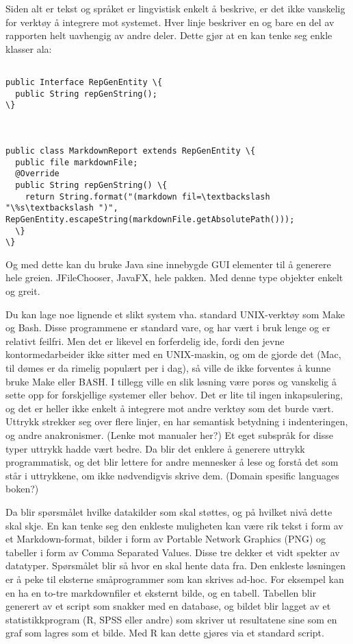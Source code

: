 \documentclass[11pt]{article}
\begin{document}
Siden alt er tekst og språket er lingvistisk enkelt å beskrive, er det ikke vanskelig for verktøy å integrere mot systemet.
Hver linje beskriver en og bare en del av rapporten helt uavhengig av andre deler. Dette gjør at en kan tenke seg enkle klasser ala:




\begin{lstlisting}

public Interface RepGenEntity \{
  public String repGenString();
\}



public class MarkdownReport extends RepGenEntity \{
  public file markdownFile;
  @Override
  public String repGenString() \{
    return String.format("(markdown fil=\textbackslash "\%s\textbackslash ")", RepGenEntity.escapeString(markdownFile.getAbsolutePath()));
  \}
\}
\end{lstlisting}




Og med dette kan du bruke Java sine innebygde GUI elementer til å generere hele greien. JFileChooser, JavaFX, hele pakken. Med denne type objekter enkelt og greit.



Du kan lage noe lignende et slikt system vha. standard UNIX-verktøy som Make og Bash. Disse programmene er standard vare, og har vært i bruk lenge og er relativt feilfri. Men det er likevel en forferdelig ide, fordi den jevne kontormedarbeider ikke sitter med en UNIX-maskin, og om de gjorde det (Mac, til dømes er da rimelig populært per i dag), så ville de ikke forventes å kunne bruke Make eller BASH. 
I tillegg ville en slik løsning være porøs og vanskelig å sette opp for forskjellige systemer eller behov. Det er lite til ingen inkapsulering, og det er heller ikke enkelt å integrere mot andre verktøy som det burde vært. Uttrykk strekker seg over flere linjer, en har semantisk betydning i indenteringen, og andre anakronismer. (Lenke mot manualer her?)
Et eget subspråk for disse typer uttrykk hadde vært bedre. Da blir det enklere å generere uttrykk programmatisk, og det blir lettere for andre mennesker å lese og forstå det som står i uttrykkene, om ikke nødvendigvis skrive dem. (Domain spesific languages boken?)



Da blir spørsmålet hvilke datakilder som skal støttes, og på hvilket nivå dette skal skje. En kan tenke seg den enkleste muligheten kan være rik tekst i form av et Markdown-format, bilder i form av Portable Network Graphics (PNG) og tabeller i form av Comma Separated Values. Disse tre dekker et vidt spekter av datatyper. Spørsmålet blir så hvor en skal hente data fra. Den enkleste løsningen er å peke til eksterne småprogrammer som kan skrives ad-hoc. For eksempel kan en ha en to-tre markdownfiler et eksternt bilde, og en tabell. Tabellen blir generert av et script som snakker med en database, og bildet blir lagget av et statistikkprogram (R, SPSS eller andre) som skriver ut resultatene sine som en graf som lagres som et bilde. Med R kan dette gjøres via et standard script.
\end{document}
